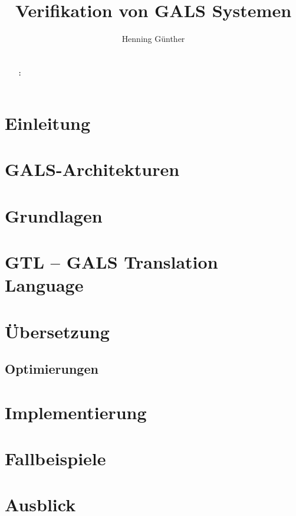 \documentclass[masterarbeit]{thesis}
\title{Verifikation von GALS Systemen}
\author{Henning Günther}
\begin{document}
\maketitle

\pagestyle{headings}
\makeatletter
\erklaerung{\@author}
\makeatother

\begin{abstract}
  \thispagestyle{headings}
  
  \\[5pt]
  {\bf \keywordsname :} \makeatletter\@keywords\makeatother
\end{abstract}
\cleardoublepage
{}
\tableofcontents
\listoffigures
\listoftables
\cleardoublepage
{}
\chapter{Einleitung}

\chapter{GALS-Architekturen}
\label{sec:gals}

\chapter{Grundlagen}
\label{sec:basics}







\chapter{GTL -- GALS Translation Language}
\label{sec:gtl}

\chapter{Übersetzung}
\label{sec:translation}




\section{Optimierungen}



\chapter{Implementierung}
\label{sec:implementation}

\chapter{Fallbeispiele}
\label{sec:case_studies}

\chapter{Ausblick}
\label{sec:conclusion}


\begin{appendix}
  
  
\end{appendix}
\end{document}
